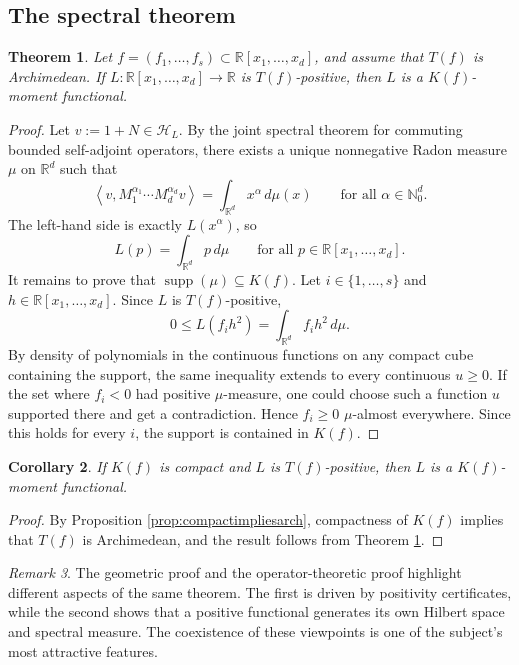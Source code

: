 \documentclass[11pt]{amsart}
\numberwithin{equation}{section}
\newtheorem{theorem}{Theorem}[section]
\newtheorem{corollary}[theorem]{Corollary}
\theoremstyle{definition}
\theoremstyle{remark}
\newtheorem{remark}[theorem]{Remark}
\newcommand{\R}{\mathbb{R}}
\newcommand{\N}{\mathbb{N}}
\newcommand{\Hcal}{\mathcal{H}}
\newcommand{\Rxd}{\R[x_1,\dots,x_d]}
\newcommand{\supp}{\operatorname{supp}}
\newcommand{\ip}[2]{\left\langle #1,#2 \right\rangle}
\newcommand{\1}{\mathbf{1}}
\begin{document}
\subsection{The spectral theorem}

\begin{theorem}\label{thm:compactkmomentoperator}
Let \(f=(f_1,\dots,f_s)\subset\Rxd\), and assume that \(T(f)\) is Archimedean. If \(L:\Rxd\to\R\) is \(T(f)\)-positive, then \(L\) is a \(K(f)\)-moment functional.
\end{theorem}

\begin{proof}
Let \(v:=1+N\in \Hcal_L\). By the joint spectral theorem for commuting bounded self-adjoint operators, there exists a unique nonnegative Radon measure \(\mu\) on \(\R^d\) such that
\[
\ip{v}{M_1^{\alpha_1}\cdots M_d^{\alpha_d}v}=\int_{\R^d} x^\alpha\,d\mu(x)
\qquad \text{for all }\alpha\in\N_0^d.
\]
The left-hand side is exactly \(L(x^\alpha)\), so
\[
L(p)=\int_{\R^d} p\,d\mu \qquad \text{for all }p\in\Rxd.
\]
It remains to prove that \(\supp(\mu)\subseteq K(f)\). Let \(i\in\{1,\dots,s\}\) and \(h\in\Rxd\). Since \(L\) is \(T(f)\)-positive,
\[
0\le L(f_ih^2)=\int_{\R^d} f_i h^2\,d\mu.
\]
By density of polynomials in the continuous functions on any compact cube containing the support, the same inequality extends to every continuous \(u\ge 0\). If the set where \(f_i<0\) had positive \(\mu\)-measure, one could choose such a function \(u\) supported there and get a contradiction. Hence \(f_i\ge 0\) \(\mu\)-almost everywhere. Since this holds for every \(i\), the support is contained in \(K(f)\).
\end{proof}

\begin{corollary}
If \(K(f)\) is compact and \(L\) is \(T(f)\)-positive, then \(L\) is a \(K(f)\)-moment functional.
\end{corollary}

\begin{proof}
By Proposition \ref{prop:compactimpliesarch}, compactness of \(K(f)\) implies that \(T(f)\) is Archimedean, and the result follows from Theorem \ref{thm:compactkmomentoperator}.
\end{proof}

\begin{remark}
The geometric proof and the operator-theoretic proof highlight different aspects of the same theorem. The first is driven by positivity certificates, while the second shows that a positive functional generates its own Hilbert space and spectral measure. The coexistence of these viewpoints is one of the subject's most attractive features.
\end{remark}
\end{document}

